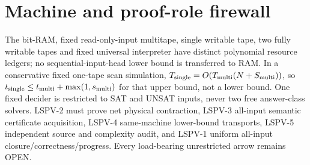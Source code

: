 \documentclass[11pt]{article}
\begin{document}
\section{Machine and proof-role firewall}
The bit-RAM, fixed read-only-input multitape, single writable tape, two fully writable tapes and fixed universal interpreter have distinct polynomial resource ledgers; no sequential-input-head lower bound is transferred to RAM. In a conservative fixed one-tape scan simulation, $T_{\rm single}=O(T_{\rm multi}(N+S_{\rm multi}))$, so $t_{\rm single}\le t_{\rm multi}+\max(1,s_{\rm multi})$ for that upper bound, not a lower bound. One fixed decider is restricted to SAT and UNSAT inputs, never two free answer-class solvers. LSPV-2 must prove net physical contraction, LSPV-3 all-input semantic certificate acquisition, LSPV-4 same-machine lower-bound transports, LSPV-5 independent source and complexity audit, and LSPV-1 uniform all-input closure/correctness/progress. Every load-bearing unrestricted arrow remains OPEN.
\end{document}

